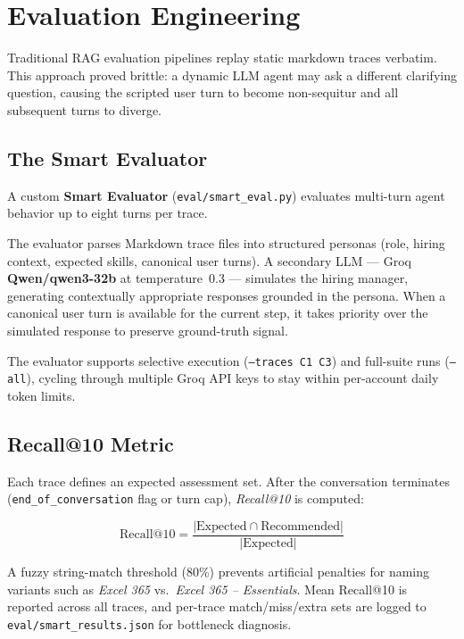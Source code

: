 \documentclass[10pt,twocolumn,letterpaper]{article}
\begin{document}

\section{Evaluation Engineering}

Traditional RAG evaluation pipelines replay static markdown traces
verbatim. This approach proved brittle: a dynamic LLM agent may ask a
different clarifying question, causing the scripted user turn to become
non-sequitur and all subsequent turns to diverge.

\subsection{The Smart Evaluator}

A custom \textbf{Smart Evaluator} (\texttt{eval/smart\_eval.py})
evaluates multi-turn agent behavior up to eight turns per trace.

The evaluator parses Markdown trace files into structured personas
(role, hiring context, expected skills, canonical user turns). A
secondary LLM --- Groq \textbf{Qwen/qwen3-32b} at temperature~0.3 ---
simulates the hiring manager, generating contextually appropriate
responses grounded in the persona. When a canonical user turn is
available for the current step, it takes priority over the simulated
response to preserve ground-truth signal.

The evaluator supports selective execution (\texttt{--traces C1 C3})
and full-suite runs (\texttt{--all}), cycling through multiple Groq
API keys to stay within per-account daily token limits.

\subsection{Recall@10 Metric}

Each trace defines an expected assessment set. After the conversation
terminates (\texttt{end\_of\_conversation} flag or turn cap),
\textit{Recall@10} is computed:

\begin{equation*}
\text{Recall@10} = \frac{|\text{Expected} \cap \text{Recommended}|}{|\text{Expected}|}
\end{equation*}

A fuzzy string-match threshold (80\%) prevents artificial penalties
for naming variants such as \textit{Excel 365} vs.\
\textit{Excel 365 -- Essentials}. Mean Recall@10 is reported across
all traces, and per-trace match/miss/extra sets are logged to
\texttt{eval/smart\_results.json} for bottleneck diagnosis.
\end{document}
